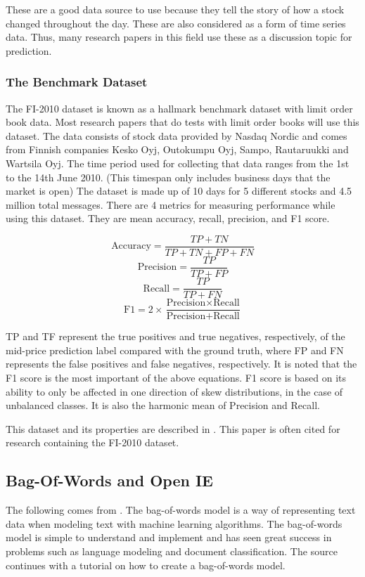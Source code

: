 \documentclass{article}
\theoremstyle{plain}
\theoremstyle{definition}
\numberwithin{equation}{section}
\numberwithin{theorem}{section}
\numberwithin{lemma}{section}
\numberwithin{definition}{section}
\numberwithin{proposition}{section}
\numberwithin{corollary}{section}
\begin{document}
	These are a good data source to use because they tell the story of how a stock changed throughout the day. These are also considered as a form of time series data.  Thus, many research papers in this field use these as a discussion topic for prediction.
	
	\subsubsection{The Benchmark Dataset}
	The FI-2010 dataset is known as a hallmark benchmark dataset with limit order book data. Most research papers that do tests with limit order books will use this dataset. The data consists of stock data provided by Nasdaq Nordic and comes from Finnish companies Kesko Oyj, Outokumpu Oyj, Sampo, Rautaruukki and Wartsila Oyj. The time period used for collecting that data ranges from the 1st to the 14th June 2010. (This timespan only includes business days that the market is open) The dataset is made up of 10 days for 5 different stocks and 4.5 million total messages. There are 4 metrics for measuring performance while using this dataset. They are mean accuracy, recall, precision, and F1 score.
	
	$$ \text{Accuracy} = \dfrac{TP+TN}{TP+TN+FP+FN} $$
	$$ \text{Precision} = \dfrac{TP}{TP+FP} $$
	$$ \text{Recall} = \dfrac{TP}{TP+FN} $$
	$$ \text{F1} = 2 \times \dfrac{\text{Precision} \times \text{Recall}}{\text{Precision} + \text{Recall}} $$
	
	
	TP and TF represent the true positives and true negatives, respectively,
	of the mid-price prediction label compared with the ground truth, where FP and
	FN represents the false positives and false negatives, respectively. It is noted that the F1 score is the most important of the above equations.  F1 score is based on its ability to only be affected in one direction of skew distributions, in the case of unbalanced classes. It is also the harmonic mean of Precision and Recall.
	  
	  
	This dataset and its properties are described in \cite{benchmarkData}. This paper is often cited for research containing the FI-2010 dataset.
	
	
	\subsection{Bag-Of-Words and Open IE}
	The following comes from \cite{brownlee2017}. The bag-of-words model is a way of representing text data when modeling text with machine learning algorithms. The bag-of-words model is simple to understand and implement and has seen great success in problems such as language modeling and document classification. The source continues with a tutorial on how to create a bag-of-words model.
	
\end{document}
